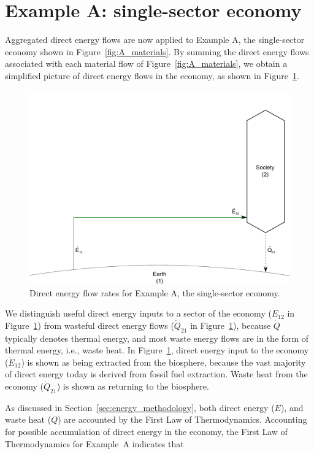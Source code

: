 \section{Example A: single-sector economy}
\label{sec:A_energy}

Aggregated direct energy flows are now applied to Example A, 
the single-sector economy shown in Figure~\ref{fig:A_materials}.
By summing the direct energy flows associated with
each material flow of Figure~\ref{fig:A_materials}, we obtain
a simplified picture of direct energy flows in the economy,
as shown in Figure~\ref{fig:A_energy}.

\begin{figure}[h!]
\centering
\includegraphics[width=0.8\linewidth]{Part_2/Chapter_Energy/images/1_sector_direct_energy.pdf}
\caption{Direct energy flow rates for Example A, the single-sector economy.}
\label{fig:A_energy}
\end{figure}

We distinguish useful direct energy inputs to a sector of the economy
($\dot{E}_{12}$ in Figure~\ref{fig:A_energy}) from wasteful direct energy flows 
($\dot{Q}_{21}$ in Figure~\ref{fig:A_energy}), 
because $\dot{Q}$ typically denotes thermal energy, 
and most waste energy flows are in the form of thermal
energy, i.e., waste heat. In Figure~\ref{fig:A_energy}, direct energy input to the 
economy ($\dot{E}_{12}$) is shown as being extracted from the biosphere, because
the vast majority of direct energy today is derived from fossil fuel extraction.
Waste heat from the economy ($\dot{Q}_{21}$) is shown as returning 
to the biosphere.

As discussed in Section~\ref{sec:energy_methodology}, 
both direct energy ($\dot{E}$), and waste heat ($\dot{Q}$) 
are accounted by the First Law of Thermodynamics. 
Accounting for possible accumulation of direct energy in the economy, 
the First Law of Thermodynamics for Example~A indicates that

